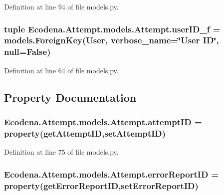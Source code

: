 Definition at line 94 of file models.py.

\hypertarget{class_ecodena_1_1_attempt_1_1models_1_1_attempt_ac1f50e1b0c5ccfc3e16fff6b5069c01e}{
\subsubsection[{userID\_\-f}]{\setlength{\rightskip}{0pt plus 5cm}tuple {\bf Ecodena.Attempt.models.Attempt.userID\_\-f} = models.ForeignKey(User, verbose\_\-name=\char`\"{}User ID\char`\"{}, null=False)}}
\label{d5/da0/class_ecodena_1_1_attempt_1_1models_1_1_attempt_ac1f50e1b0c5ccfc3e16fff6b5069c01e}


Definition at line 64 of file models.py.



\subsection{Property Documentation}
\hypertarget{class_ecodena_1_1_attempt_1_1models_1_1_attempt_a69f17e74058d4360d4ca443bd5c27cbc}{
\subsubsection[{attemptID}]{\setlength{\rightskip}{0pt plus 5cm}Ecodena.Attempt.models.Attempt.attemptID = property(getAttemptID,setAttemptID)}}
\label{d5/da0/class_ecodena_1_1_attempt_1_1models_1_1_attempt_a69f17e74058d4360d4ca443bd5c27cbc}


Definition at line 75 of file models.py.

\hypertarget{class_ecodena_1_1_attempt_1_1models_1_1_attempt_a76b4e1e2270faa387469f0a6b5bd47ec}{
\subsubsection[{errorReportID}]{\setlength{\rightskip}{0pt plus 5cm}Ecodena.Attempt.models.Attempt.errorReportID = property(getErrorReportID,setErrorReportID)}}
\label{d5/da0/class_ecodena_1_1_attempt_1_1models_1_1_attempt_a76b4e1e2270faa387469f0a6b5bd47ec}


